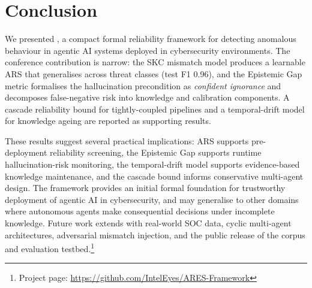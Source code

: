 \section{Conclusion}
\label{sec:conclusion}

We presented \ARES{}, a compact formal reliability framework for
detecting anomalous behaviour in agentic AI systems deployed in
cybersecurity environments. The conference contribution is narrow:
the SKC mismatch model produces a learnable ARS that generalises
across threat classes (test F1 0.96), and the Epistemic Gap
metric formalises the hallucination precondition as
\textit{confident ignorance} and decomposes false-negative risk into
knowledge and calibration components. A cascade reliability bound for
tightly-coupled pipelines and a temporal-drift model for knowledge
ageing are reported as supporting results.

These results suggest several practical implications: ARS supports
pre-deployment reliability screening, the Epistemic Gap supports
runtime hallucination-risk monitoring, the temporal-drift model
supports evidence-based knowledge maintenance, and the cascade bound
informs conservative multi-agent design. The framework provides an
initial formal foundation for trustworthy deployment of agentic AI in
cybersecurity, and may generalise to other domains where autonomous
agents make consequential decisions under incomplete knowledge.
Future work extends \ARES{} with real-world SOC data, cyclic
multi-agent architectures, adversarial mismatch injection, and the
public release of the \SAFK{} corpus and evaluation
testbed.\footnote{Project page: \url{https://github.com/IntelEyes/ARES-Framework}}
